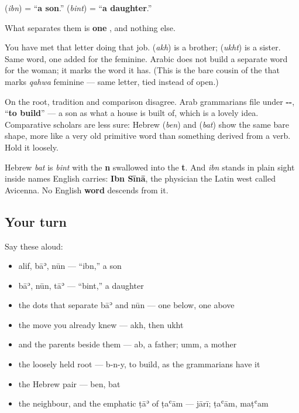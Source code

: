 \begin{cousinweb}
\textbf{} (\emph{ibn}) = \textquotedblleft{}\textbf{a son}.\textquotedblright{} \textbf{} (\emph{bint}) = \textquotedblleft{}\textbf{a daughter}.\textquotedblright{}

What separates them is \textbf{one }, and nothing else.

You have met that letter doing that job. \textbf{} (\emph{akh}) is a brother; \textbf{} (\emph{ukht}) is a sister. Same word, one \textbf{} added for the feminine. Arabic does not build a separate word for the woman; it marks the word it has. (This is the bare cousin of the \textbf{} that marks \emph{qahwa} feminine — same letter, tied instead of open.)

On the root, tradition and comparison disagree. Arab grammarians file \textbf{} under \textbf{--}, \textquotedblleft{}\textbf{to build}\textquotedblright{} — a son as what a house is built of, which is a lovely idea. Comparative scholars are less sure: Hebrew \textbf{} (\emph{ben}) and \textbf{} (\emph{bat}) show the same bare shape, more like a very old primitive word than something derived from a verb. Hold it loosely.

Hebrew \emph{bat} is \emph{bint} with the \textbf{n} swallowed into the \textbf{t}. And \emph{ibn} stands in plain sight inside names English carries: \textbf{Ibn Sīnā}, the physician the Latin west called Avicenna. No English \textbf{word} descends from it.
\end{cousinweb}

\subsection*{Your turn}
Say these aloud:

\begin{itemize}
\raggedright
  \item alif, bāʾ, nūn — \textquotedblleft{}ibn,\textquotedblright{} a son
  \item bāʾ, nūn, tāʾ — \textquotedblleft{}bint,\textquotedblright{} a daughter
  \item the dots that separate bāʾ and nūn — one below, one above
  \item the move you already knew — akh, then ukht
  \item and the parents beside them — ab, a father; umm, a mother
  \item the loosely held root — b-n-y, to build, as the grammarians have it
  \item the Hebrew pair — ben, bat
  \item the neighbour, and the emphatic ṭāʾ of ṭaʿām — jārī; ṭaʿām, maṭʿam
\end{itemize}

